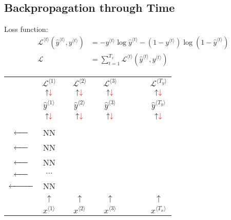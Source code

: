 \subsection{Backpropagation through Time}
Loss function:
\begin{align*}
  \mathcal{L}^{\langle t\rangle}\left(\hat{y}^{\langle t\rangle}, y^{\langle t\rangle}\right)&=-y^{\langle t\rangle}\log\hat{y}^{\langle t\rangle}-\left(1-y^{\langle t\rangle}\right)\log\left(1-\hat{y}^{\langle t\rangle}\right)\\
  \mathcal{L}&=\displaystyle\sum_{t=1}^{T_x}\mathcal{L}^{\langle t\rangle}\left(\hat{y}^{\langle t\rangle}, y^{\langle t\rangle}\right)
\end{align*}
\begin{center}
  \begin{tabular}{cccccccccc}
    & $\mathcal{L}^{\langle 1\rangle}$ & & $\mathcal{L}^{\langle 2\rangle}$ & & $\mathcal{L}^{\langle 3\rangle}$ & & & & $\mathcal{L}^{\langle T_y\rangle}$\\
    & $\uparrow\color{red}\downarrow$ & & $\uparrow\color{red}\downarrow$ & & $\uparrow\color{red}\downarrow$ & & & & $\uparrow\color{red}\downarrow$\\ 
    & $\hat{y}^{\langle 1\rangle}$ & & $\hat{y}^{\langle 2\rangle}$ & & $\hat{y}^{\langle 3\rangle}$ & & & & $\hat{y}^{\langle T_y\rangle}$\\
    & $\uparrow\color{red}\downarrow$ & & $\uparrow\color{red}\downarrow$ & & $\uparrow\color{red}\downarrow$ & & & & $\uparrow\color{red}\downarrow$\\ 
    \makecell{$\xrightarrow{a^{\langle 0\rangle}}$\\\color{red}$\xleftarrow{\hphantom{a^{\langle 0\rangle}}}$}& NN & \makecell{$\xrightarrow{a^{\langle 1\rangle}}$\\\color{red}$\xleftarrow{\hphantom{a^{\langle 0\rangle}}}$} & NN & \makecell{$\xrightarrow{a^{\langle 2\rangle}}$\\\color{red}$\xleftarrow{\hphantom{a^{\langle 2\rangle}}}$} & NN & \makecell{$\xrightarrow{a^{\langle 3\rangle}}$\\\color{red}$\xleftarrow{\hphantom{a^{\langle 0\rangle}}}$} & $\cdots$ & \makecell{$\xrightarrow{a^{\langle T_x-1\rangle}}$\\\color{red}$\xleftarrow{\hphantom{a^{\langle T_x-1\rangle}}}$} & NN \\ 
    & $\uparrow$ & & $\uparrow$ & & $\uparrow$ & & & & $\uparrow$\\ 
    & $x^{\langle 1\rangle}$ & & $x^{\langle 2\rangle}$ & & $x^{\langle 3\rangle}$ & & & & $x^{\langle T_x\rangle}$\\
  \end{tabular}
\end{center}
